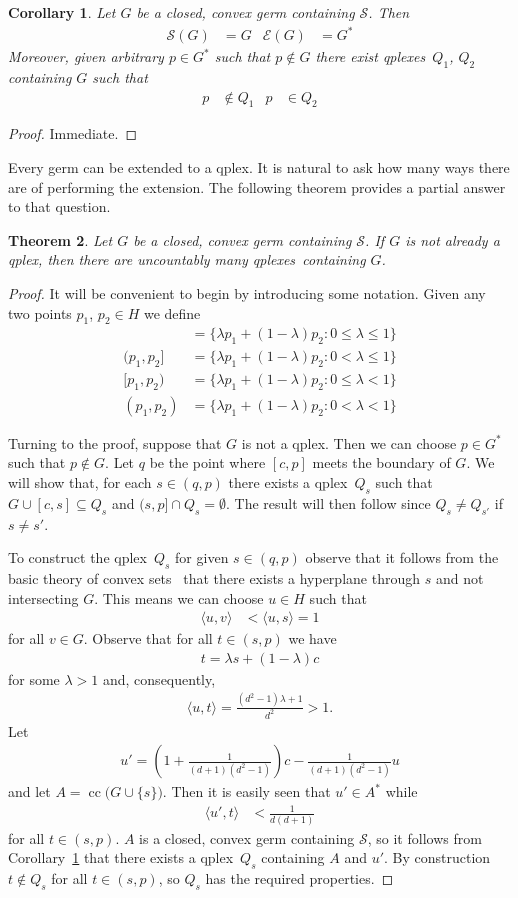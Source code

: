 \documentclass[aps,pra,superscriptaddress,10pt,tightenlines,twocolumn,nofootinbib]{revtex4}
\newtheorem{theorem}{Theorem}
\newtheorem{corollary}[theorem]{Corollary}
\theoremstyle{remark}
\newcommand{\ea}[1]{\begin{align}#1\end{align}}
\newcommand{\la}{\langle}
\newcommand{\ra}{\rangle}
\newcommand{\dl}[1]{#1^{*}}
\newcommand{\qp}{Q}
\newcommand{\pr}{G}
\newcommand{\qplex}{qplex}
\newcommand{\qplexes}{qplexes}
\newcommand{\stm}{\mathscr{S}}
\newcommand{\env}{\mathscr{E}}
\DeclareMathOperator{\cc}{cc}
\begin{document}
\begin{corollary}
\label{cr:germExtend}
Let $\pr$ be a closed, convex germ containing $\stm$.  Then
\begin{align}
\stm(\pr) &  = \pr & \env(\pr) & = \dl{\pr}
\end{align}
Moreover, given arbitrary $p\in \dl{\pr}$ such that $p \notin \pr$ there exist \qplexes\ $\qp_1$, $\qp_2$ containing $\pr$ such that
\begin{align}
p &\notin \qp_1 & p& \in \qp_2
\end{align}
\end{corollary}
\begin{proof}
Immediate.
\end{proof}
Every germ can be extended to a \qplex.  It is natural to ask how many ways there are of performing the extension.  The following theorem provides a partial answer to that question.
\begin{theorem}
Let $\pr$ be a closed, convex germ containing $\stm$.  If $\pr$ is not already a \qplex, then there are uncountably many \qplexes\ containing $\pr$.
\end{theorem}
\begin{proof}
It will be convenient to begin by introducing some notation.  Given any two  points $p_1$, $p_2\in H$ we define
\ea{
[p_1,p_2]&=\{\lambda p_1 + (1-\lambda)p_2 \colon 0 \le \lambda \le 1\}
\\
(p_1,p_2]&=\{\lambda p_1 + (1-\lambda)p_2 \colon 0 < \lambda \le 1\}
\\
[p_1,p_2)&=\{\lambda p_1 + (1-\lambda)p_2 \colon 0 \le \lambda < 1\}
\\
(p_1,p_2)&=\{\lambda p_1 + (1-\lambda)p_2 \colon 0 < \lambda <1\}
}

Turning to the proof, suppose that
 $\pr$ is not a \qplex.  Then we can choose $p \in \dl{\pr}$ such that $p \notin \pr$.  Let $q$ be the point where $[c,p]$ meets the boundary of $\pr$.  We will show that, for each  $s \in (q,p)$ there exists a \qplex\ $\qp_s$ such that $\pr \cup [c,s] \subseteq \qp_s$ and $(s,p] \cap \qp_s = \emptyset$.  The result will then follow since $\qp_s \neq \qp_{s'}$ if $s\neq s'$.

To construct the \qplex\ $\qp_s$ for given $s\in (q,p)$ observe that it follows from the basic theory of convex sets~\cite{grun} that there exists a hyperplane through $s$ and not intersecting $\pr$.   This means we can choose  $u\in H$ such that
\ea{
\la u, v \ra & <   \la u, s\ra   =1
}
for all $v\in\pr$. Observe that for all $t \in (s,p)$ we have
\ea{
t = \lambda s + (1-\lambda) c
}
for some $\lambda >1$ and, consequently,
\ea{
\la u, t \ra =
\frac{(d^2-1)\lambda  + 1}{d^2} > 1.
}
Let
\ea{
u' = \left(1 + \frac{1}{(d+1)(d^2-1)}\right) c - \frac{1}{(d+1)(d^2-1)} u
}
and let $A=\cc\bigl( \pr \cup \{s\}\bigr)$.  Then it is easily seen that $u'\in \dl{A}$ while
\ea{
\la u' , t \ra & < \frac{1}{d(d+1)}
}
for all $t \in (s,p)$.  $A$ is a closed, convex germ containing $\stm$, so it follows from Corollary~\ref{cr:germExtend} that there exists a \qplex\ $\qp_s$ containing $A$ and $u'$.  By construction $t \notin \qp_s$ for all $t\in (s,p)$, so $\qp_s$ has the  required properties.
\end{proof}
\end{document}
